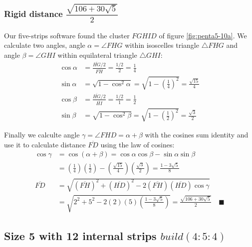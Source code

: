 \documentclass[11pt]{article}
\begin{document}
\subsubsection{Rigid distance $\dfrac{\sqrt{106 + 30\sqrt5}}2$}

Our five-strips software found the cluster $FGHID$ of figure \ref{fig:penta5-10a}. We calculate two angles, angle $\alpha = \angle{FHG}$ within isoscelles triangle $\triangle{FHG}$ and angle $\beta = \angle{GHI}$ within equilateral triangle $\triangle{GHI}$:
\begin{align}
\cos\alpha &= \frac{\overline{HG}/2}{\overline{FH}} = \frac{1/2}2 = \frac{1}4 \\
\sin\alpha &= \sqrt{1 - \cos^2\alpha} = \sqrt{1 - \left(\frac{1}4\right)^2} = \frac{\sqrt{15}}4\\
%
\cos\beta &= \frac{\overline{HG}/2}{\overline{HI}} = \frac{1/2}{1} = \frac{1}2 \\
\sin\beta &= \sqrt{1 - \cos^2\beta} = \sqrt{1 - \left(\frac{1}2\right)^2} = \frac{\sqrt{3}}2
\end{align}

Finally we calculte angle $\gamma = \angle{FHD} = \alpha + \beta$ with the cosines sum identity and use it to calculate distance $\overline{FD}$ using the law of cosines:
\begin{align}
\cos\gamma &= \cos(\alpha+\beta) = \cos\alpha\cos\beta - \sin\alpha\sin\beta \nonumber\\
 &= \left(\frac{1}4\right)\left(\frac{1}2\right) 
  - \left(\frac{\sqrt{15}}4\right)\left(\frac{\sqrt{3}}2\right)
  = \frac{1 - 3\sqrt{5}}8 \\
\overline{FD} &= \sqrt{(\overline{FH})^2 + (\overline{HD})^2 
 - 2(\overline{FH})(\overline{HD})\cos\gamma} \nonumber\\
 &= \sqrt{2^2 + 5^2 - 2(2)(5)\left(\frac{1 - 3\sqrt{5}}8\right)}
 = \frac{\sqrt{106 + 30\sqrt5}}2 \quad \blacksquare
\end{align}



\subsection{Size 5 with 12 internal strips $build(4:5:4)$}
\end{document}
